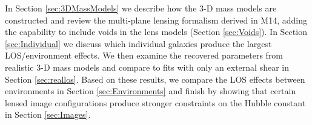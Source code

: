 In Section \ref{sec:3DMassModels} we describe how the 3-D mass models are constructed and review the multi-plane lensing formalism derived in M14, adding the capability to include voids in the lens models (Section \ref{sec:Voids}). In Section \ref{sec:Individual} we discuss which individual galaxies produce the largest LOS/environment effects. We then examine the recovered parameters from realistic 3-D mass models and compare to fits with only an external shear in Section \ref{sec:reallos}. Based on these results, we compare the LOS effects between environments in Section \ref{sec:Environments} and finish by showing that certain lensed image configurations produce stronger constraints on the Hubble constant in Section \ref{sec:Images}.